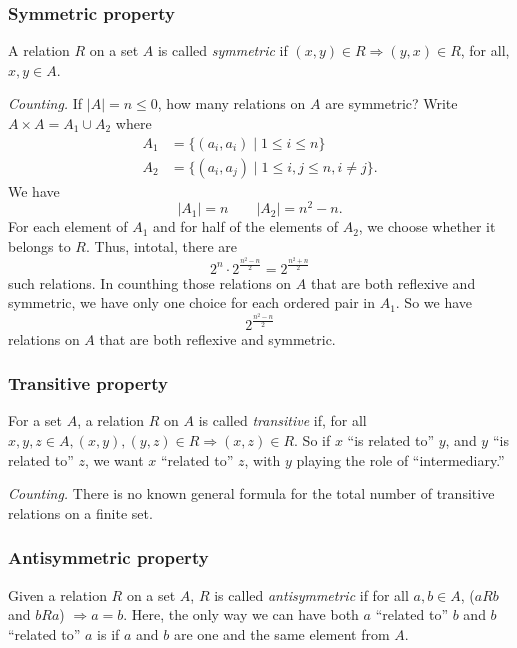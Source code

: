\documentclass[11pt]{article}
\begin{document}
    \subsubsection{Symmetric property}

    A relation $R$ on a set $A$ is called \emph{symmetric} if \((x,y) \in R \Rightarrow (y,x) \in R\), for all, \(x,y \in A\).

    \vspace{1em}

    \emph{Counting.} If \(|A| = n \leq 0\), how many relations on $A$ are symmetric? Write \(A \times A = A_1 \cup A_2\) where
    \begin{align*}
        A_1 &= \{(a_i, a_i) \mid 1 \leq i \leq n\} \\
        A_2 &= \{(a_i, a_j) \mid 1 \leq i, j \leq n, i \neq j\}.
    \end{align*}
    We have \[|A_1| = n \qquad |A_2| = n^2 - n.\] For each element of \(A_1\) and for half of the elements of \(A_2\), we choose whether it belongs to $R$. Thus, intotal, there are \[2^n \cdot 2^{\frac{n^2-n}{2}} = 2^{\frac{n^2+n}{2}}\] such relations. In counthing those relations on $A$ that are both reflexive and symmetric, we have only one choice for each ordered pair in \(A_1\). So we have \[2^{\frac{n^2 - n}{2}}\] relations on $A$ that are both reflexive and symmetric.

    \subsubsection{Transitive property}

    For a set $A$, a relation $R$ on $A$ is called \emph{transitive} if, for all \(x,y,z \in A, (x,y), (y,z) \in R \Rightarrow (x,z) \in R\). So if $x$ ``is related to'' $y$, and $y$ ``is related to'' $z$, we want $x$ ``related to'' $z$, with $y$ playing the role of ``intermediary.''

    \vspace{1em}

    \emph{Counting.} There is no known general formula for the total number of transitive relations on a finite set.

    \subsubsection{Antisymmetric property}

    Given a relation $R$ on a set $A$, $R$ is called \emph{antisymmetric} if for all \(a,b \in A\), (\(a R b\) and \(b R a\)) \(\Rightarrow a = b.\) Here, the only way we can have both $a$ ``related to'' $b$ and $b$ ``related to'' $a$ is if $a$ and $b$ are one and the same element from $A$.
\end{document}
